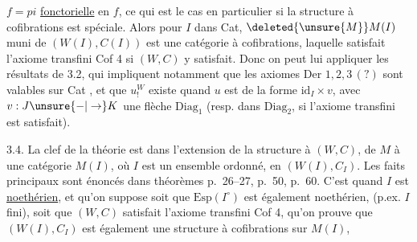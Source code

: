 $f=pi$ \uline{fonctorielle} en $f$, ce qui est le cas
en particulier si la structure à cofibrations
est spéciale. Alors pour  $I$ dans
Cat, $\deleted{\unsure{M}}M(I)$ muni de $(W(I),C(I))$ est
une catégorie à cofibrations, laquelle 
satisfait l'axiome transfini Cof 4 si
$(W,C)$ y satisfait. Donc on peut lui
appliquer les résultats de 3.2, qui
impliquent notamment que les axiomes
Der $1,2,3\,(?)$ sont valables sur Cat , et que $u^{W}_{!}$ existe quand $u$
est de la forme $\mathrm{id}_{I}\times v$, avec $v:J\unsure{-|\to}K$
une flèche  $\mathrm{Diag}_1$ (resp. dans $\mathrm{Diag}_2$, si
l'axiome transfini est satisfait).

3.4. La clef de la théorie est dans l'extension
de la structure à  $(W,C)$, de $M$
à une catégorie $M(I)$, où $I$ est un ensemble
ordonné, en $(W(I),C_I)$. Les faits principaux
sont énoncés dans   théorèmes p.~26--27, p.~50, p.~60.
C'est quand $I$ est \uline{noethérien}, et qu'on suppose
soit que $\mathrm{Esp}(I^\circ)$ est également noethérien, (p.ex.
$I$ fini), soit que $(W,C)$ satisfait l'axiome
transfini Cof 4, qu'on prouve que $(W(I),C_I)$
est également une structure à cofibrations sur $M(I)$,


